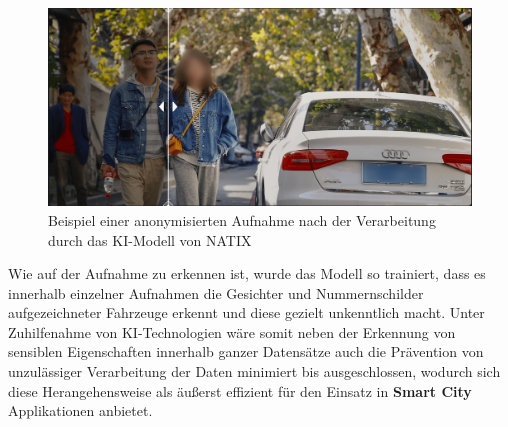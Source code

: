 \begin{figure}
    \centering
    \includegraphics[width=\textwidth]{main/countermeasures/pictures/Anonymized_Footage}
    \caption{Beispiel einer anonymisierten Aufnahme nach der Verarbeitung durch das KI-Modell von NATIX \cite{Natix2022}}
    \label{fig:anonymized-footage}
\end{figure}

Wie auf der Aufnahme zu erkennen ist, wurde das Modell so trainiert, dass es innerhalb einzelner Aufnahmen die Gesichter und Nummernschilder aufgezeichneter Fahrzeuge erkennt und diese gezielt unkenntlich macht. 
Unter Zuhilfenahme von KI-Technologien wäre somit neben der Erkennung von sensiblen Eigenschaften innerhalb ganzer Datensätze auch die Prävention von unzulässiger Verarbeitung der Daten minimiert bis ausgeschlossen, wodurch sich diese Herangehensweise als äußerst effizient für den Einsatz in \textbf{Smart City} Applikationen anbietet.

